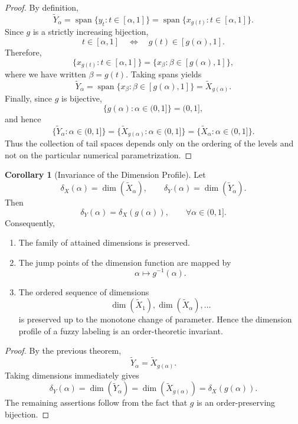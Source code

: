 \documentclass[preprint,12pt]{elsarticle}
\theoremstyle{definition}
\newtheorem{corollary}[theorem]{Corollary}
\begin{document}
\begin{proof}
	By definition,
	\[
	\widetilde{Y}_\alpha
	=
	\operatorname{span}
	\{y_t:t\in[\alpha,1]\}
	=
	\operatorname{span}
	\{x_{g(t)}:t\in[\alpha,1]\}.
	\]
	Since $g$ is a strictly increasing bijection,
	\[
	t\in[\alpha,1]
	\quad\Longleftrightarrow\quad
	g(t)\in[g(\alpha),1].
	\]
	Therefore,
	\[
	\{x_{g(t)}:t\in[\alpha,1]\}
	=
	\{x_\beta:\beta\in[g(\alpha),1]\},
	\]
	where we have written $\beta=g(t)$.
	Taking spans yields
	\[
	\widetilde{Y}_\alpha
	=
	\operatorname{span}
	\{x_\beta:\beta\in[g(\alpha),1]\}
	=
	\widetilde{X}_{g(\alpha)}.
	\]
	Finally, since $g$ is bijective,
	\[
	\{g(\alpha):\alpha\in(0,1]\}
	=
	(0,1],
	\]
	and hence
	\[
	\{\widetilde{Y}_\alpha:\alpha\in(0,1]\}
	=
	\{\widetilde{X}_{g(\alpha)}:\alpha\in(0,1]\}
	=
	\{\widetilde{X}_\alpha:\alpha\in(0,1]\}.
	\]
	Thus the collection of tail spaces depends only on the ordering of the
	levels and not on the particular numerical parametrization.
\end{proof}
\begin{corollary}[Invariance of the Dimension Profile]
	Let
	\[
	\delta_X(\alpha)
	=
	\dim(\widetilde X_\alpha),
	\qquad
	\delta_Y(\alpha)
	=
	\dim(\widetilde Y_\alpha).
	\]Then
	\[
	\delta_Y(\alpha)
	=
	\delta_X(g(\alpha)),
	\qquad
	\forall\alpha\in(0,1].
	\]Consequently,
	
	\begin{enumerate}
		\item
		The family of attained dimensions is preserved.
		
		\item
		The jump points of the dimension function are mapped by
		\[
		\alpha
		\longmapsto
		g^{-1}(\alpha).
		\]
		
		\item
		The ordered sequence of dimensions
		\[
		\dim(\widetilde X_1),
		\dim(\widetilde X_{\alpha}),
		\ldots
		\]
		is preserved up to the monotone change of parameter.
		Hence the dimension profile of a fuzzy labeling is an
		order-theoretic invariant.
	\end{enumerate}
\end{corollary}

\begin{proof}
	By the previous theorem,
	\[
	\widetilde Y_\alpha
	=
	\widetilde X_{g(\alpha)}.
	\]
	Taking dimensions immediately gives
	\[
	\delta_Y(\alpha)
	=
	\dim(\widetilde Y_\alpha)
	=
	\dim(\widetilde X_{g(\alpha)})
	=
	\delta_X(g(\alpha)).
	\]The remaining assertions follow from the fact that
	\(g\) is an order-preserving bijection.
\end{proof}
\end{document}
